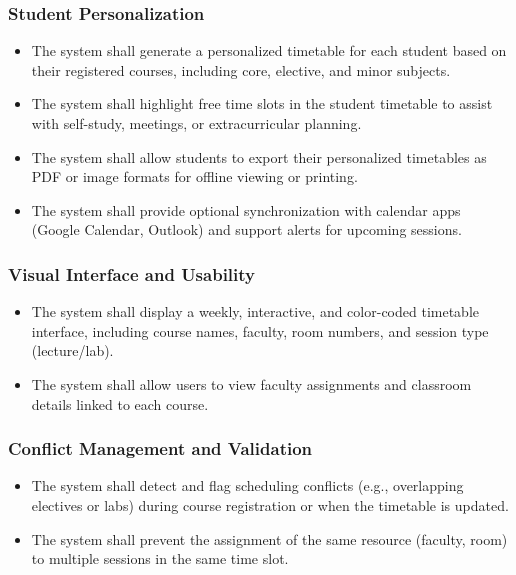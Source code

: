 \documentclass[a4paper,12pt]{article}
\begin{document}
\subsubsection{Student Personalization}
\begin{itemize}
\item The system shall generate a personalized timetable for each student based on their registered courses, including core, elective, and minor subjects.

\item The system shall highlight free time slots in the student timetable to assist with self-study, meetings, or extracurricular planning.

\item The system shall allow students to export their personalized timetables as PDF or image formats for offline viewing or printing.

\item The system shall provide optional synchronization with calendar apps (Google Calendar, Outlook) and support alerts for upcoming sessions.
\end{itemize}

\subsubsection{Visual Interface and Usability}
\begin{itemize}
\item The system shall display a weekly, interactive, and color-coded timetable interface, including course names, faculty, room numbers, and session type (lecture/lab).

\item The system shall allow users to view faculty assignments and classroom details linked to each course.
\end{itemize}

\subsubsection{Conflict Management and Validation}
\begin{itemize}
\item The system shall detect and flag scheduling conflicts (e.g., overlapping electives or labs) during course registration or when the timetable is updated.

\item The system shall prevent the assignment of the same resource (faculty, room) to multiple sessions in the same time slot.
\end{itemize}
\end{document}
